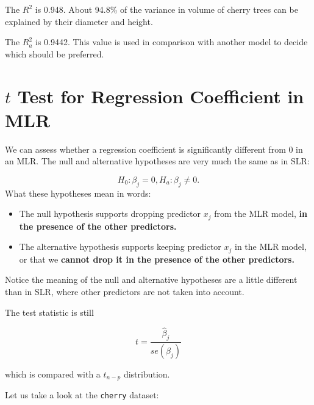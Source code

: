 \documentclass[
]{book}
\newenvironment{Shaded}{\begin{snugshade}}{\end{snugshade}}
\newcommand{\FunctionTok}[1]{\textcolor[rgb]{0.13,0.29,0.53}{\textbf{#1}}}
\newcommand{\NormalTok}[1]{#1}
\newcommand{\SpecialCharTok}[1]{\textcolor[rgb]{0.81,0.36,0.00}{\textbf{#1}}}
\providecommand{\tightlist}{%
  \setlength{\itemsep}{0pt}\setlength{\parskip}{0pt}}
\begin{document}
The \(R^2\) is 0.948. About 94.8\% of the variance in volume of cherry trees can be explained by their diameter and height.

The \(R_{a}^{2}\) is 0.9442. This value is used in comparison with another model to decide which should be preferred.

\hypertarget{t-test-for-regression-coefficient-in-mlr}{%
\section{\texorpdfstring{\(t\) Test for Regression Coefficient in MLR}{t Test for Regression Coefficient in MLR}}\label{t-test-for-regression-coefficient-in-mlr}}

We can assess whether a regression coefficient is significantly different from 0 in an MLR. The null and alternative hypotheses are very much the same as in SLR:

\[
H_0: \beta_j = 0, H_a: \beta_j \neq 0.
\]
What these hypotheses mean in words:

\begin{itemize}
\tightlist
\item
  The null hypothesis supports dropping predictor \(x_j\) from the MLR model, \textbf{in the presence of the other predictors.}
\item
  The alternative hypothesis supports keeping predictor \(x_j\) in the MLR model, or that we \textbf{cannot drop it in the presence of the other predictors.}
\end{itemize}

Notice the meaning of the null and alternative hypotheses are a little different than in SLR, where other predictors are not taken into account.

The test statistic is still

\begin{equation} 
t = \frac{\hat{\beta}_j}{se(\hat{\beta}_j)}
\label{eq:6ttest}
\end{equation}

which is compared with a \(t_{n-p}\) distribution.

Let us take a look at the \texttt{cherry} dataset:

\begin{Shaded}
\end{Shaded}
\end{document}
